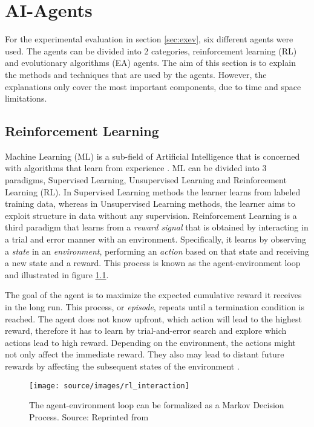 \chapter[head={AI-Agents}, tocentry={Artificial Intelligence Agents}, reference={Artificial Intelligence Agents}]{AI-Agents}\label{sec:ai_agents}
For the experimental evaluation in section \ref{sec:exev}, six different agents were used. The agents can be divided into 2 categories, reinforcement learning (RL) and evolutionary algorithms (EA) agents. The aim of this section is to explain the methods and techniques that are used by the agents. However, the explanations only cover the most important components, due to time and space limitations.

\section{Reinforcement Learning} \label{sec:rl}

Machine Learning (ML) is a sub-field of Artificial Intelligence that is concerned with algorithms that learn from experience \cite[p. 1]{mohri2018foundations}. ML can be divided into 3 paradigms, Supervised Learning, Unsupervised Learning and Reinforcement Learning (RL). In Supervised Learning methods the learner learns from labeled training data, whereas in Unsupervised Learning methods, the learner aims to exploit structure in data without any supervision. Reinforcement Learning is a third paradigm that learns from a \textit{reward signal} that is obtained by interacting in a trial and error manner with an environment. Specifically, it learns by observing a \textit{state} in an \textit{environment}, performing an \textit{action} based on that state and receiving a new state and a reward. This process is known as the agent-environment loop and illustrated in figure \ref{fig:rl_interaction}.

The goal of the agent is to maximize the expected cumulative reward it receives in the long run. This process, or \textit{episode}, repeats until a termination condition is reached. The agent does not know upfront, which action will lead to the highest reward, therefore it has to learn by trial-and-error search and explore which actions lead to high reward. Depending on the environment, the actions might not only affect the immediate reward. They also may lead to distant future rewards by affecting the subsequent states of the environment \cite[pp. 1-2]{richardsutton2018}. 
\begin{figure}[H]%
\centering
\texttt{[image: source/images/rl\_interaction]}%
\caption[Agent-environment loop MDP]{The agent-environment loop can be formalized as a Markov Decision Process. Source: Reprinted from \cite[p.48]{richardsutton2018}}%
\label{fig:rl_interaction}%
\end{figure}

